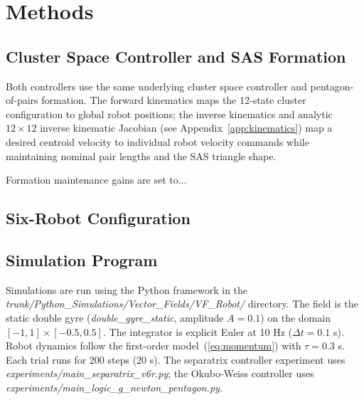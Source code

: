 \documentclass[lettersize,journal]{IEEEtran}
\begin{document}
\section{Methods}
\label{sec:methods}

\subsection{Cluster Space Controller and SAS Formation}

Both controllers use the same underlying cluster space controller and
pentagon-of-pairs formation. The forward kinematics maps the 12-state
cluster configuration to global robot positions; the inverse kinematics
and analytic $12 \times 12$ inverse kinematic Jacobian (see
Appendix~\ref{app:kinematics}) map a desired centroid velocity to
individual robot velocity commands while maintaining nominal pair lengths
and the SAS triangle shape.

Formation maintenance gains are set to...

\subsection{Six-Robot Configuration}


\subsection{Simulation Program}

Simulations are run using the Python framework in the
\textit{trunk/Python_Simulations/Vector\_Fields/VF\_Robot/} directory.
The field is the static double gyre (\textit{double\_gyre\_static},
amplitude $A = 0.1$) on the domain $[-1, 1] \times [-0.5, 0.5]$. The
integrator is explicit Euler at 10 Hz ($\Delta t = 0.1$ s). Robot dynamics
follow the first-order model~(\ref{eq:momentum}) with $\tau = 0.3$ s. Each
trial runs for 200 steps (20 s). The separatrix controller experiment uses
\textit{experiments/main\_separatrix\_v6r.py}; the Okubo-Weiss controller
uses \textit{experiments/main\_logic\_g\_newton\_pentagon.py}.
\end{document}
